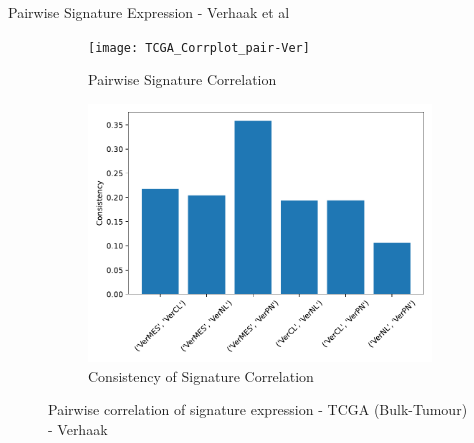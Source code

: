 \documentclass[aspectratio=169,9pt]{beamer}
\begin{document}
    \begin{frame}{Pairwise Signature Expression - Verhaak et al}
        \begin{adjustwidth}{-5cm}{-5cm}
            \centering
            \begin{figure}\ContinuedFloat
                \centering
                \begin{subfigure}[c]{0.7\textwidth}
                    \centering
                    \texttt{[image: TCGA\_Corrplot\_pair-Ver]}
                    \caption{Pairwise Signature Correlation}
                \end{subfigure}
                \begin{subfigure}[c]{0.4\textwidth}
                    \centering
                    \includegraphics[width=\textwidth]{TCGA_Consistency_Ver}
                    \caption{Consistency of Signature Correlation}
                \end{subfigure}
                \caption{Pairwise correlation of signature expression - TCGA (Bulk-Tumour) - Verhaak}
            \end{figure}
        \end{adjustwidth}
    \end{frame}
\end{document}
